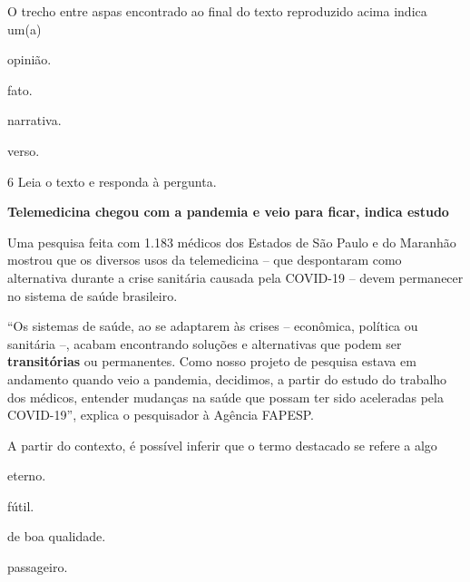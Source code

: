 \begin{myquote}
\begin{myescolha}
O trecho entre aspas encontrado ao final do texto reproduzido acima
indica um(a)

\begin{escolha}
  \item opinião.

  \item fato.

  \item narrativa.

  \item verso.
\end{escolha}

\num{6} Leia o texto e responda à pergunta.

\begin{myquote}
\textbf{Telemedicina chegou com a pandemia e veio para ficar, indica estudo}

Uma pesquisa feita com 1.183 médicos dos Estados de São Paulo e do
Maranhão mostrou que os diversos usos da telemedicina -- que despontaram
como alternativa durante a crise sanitária causada pela COVID-19 --
devem permanecer no sistema de saúde brasileiro.

``Os sistemas de saúde, ao se adaptarem às crises -- econômica, política
ou sanitária --, acabam encontrando soluções e alternativas que podem
ser \textbf{transitórias} ou permanentes. Como nosso projeto de pesquisa
estava em andamento quando veio a pandemia, decidimos, a partir do
estudo do trabalho dos médicos, entender mudanças na saúde que possam
ter sido aceleradas pela COVID-19'', explica o pesquisador à Agência
FAPESP.

\end{myquote}

A partir do contexto, é possível inferir que o termo destacado se
refere a algo

\begin{escolha}
  \item eterno.

  \item fútil.

  \item de boa qualidade.

  \item passageiro.
\end{escolha}


\end{myescolha}
\end{myquote}
